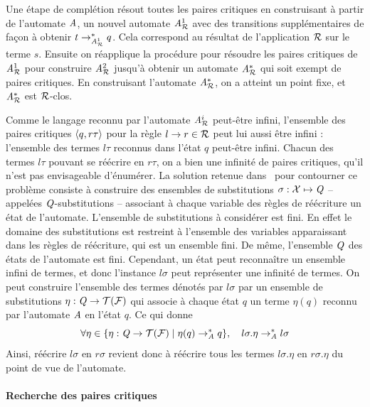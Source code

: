 
Une étape de complétion résout toutes les paires critiques en construisant
à partir de l'automate $\mathit A$, un nouvel automate ${\mathit A}_{\mathcal R}^1$ avec des transitions
supplémentaires de façon à obtenir $t \rightarrow_{{\mathit A}_{\mathcal R}^1}^* q$. Cela correspond
au résultat de l'application $\mathcal R$ sur le terme $s$. Ensuite on réapplique la procédure
pour résoudre les paires critiques de ${\mathit A}_{\mathcal R}^1$ pour construire ${\mathit A}_{\mathcal R}^2$ jusqu'à obtenir
un automate ${\mathit A}_{\mathcal R}^*$ qui soit exempt de paires critiques. En construisant l'automate ${\mathit A}_{\mathcal R}^*$,
on a atteint un point fixe, et ${\mathit A}_{\mathcal R}^*$ est $\mathcal R$-clos.

Comme le langage reconnu par l'automate ${\mathit A}_{\mathcal R}^i$ peut-être infini, l'ensemble
des paires critiques $\langle q, r\tau\rangle$ pour la règle $l\rightarrow r\in \mathcal R$ peut lui aussi être infini : 
l'ensemble des termes $l\tau$ reconnus dans l'état $q$ peut-être infini. Chacun des termes $l\tau$
pouvant se réécrire en $r\tau$, on a bien une infinité de paires critiques, qu'il n'est pas envisageable
d'énumérer.
La solution retenue dans~\cite{Genet-RTA98} pour contourner ce problème consiste à construire des ensembles de
substitutions $\sigma: \mathcal X \mapsto \mathit Q$ -- appelées $\mathit Q$-substitutions -- associant à chaque variable des règles de réécriture 
un état de l'automate. L'ensemble de substitutions à considérer est fini. En effet le domaine des substitutions est restreint à l'ensemble des
variables apparaissant dans les règles de réécriture, qui est un ensemble fini. De même, l'ensemble $\mathit Q$ des états de l'automate est fini.
Cependant, un état peut reconnaître un ensemble infini de termes, et donc l'instance $l\sigma$ peut représenter une infinité de termes.
On peut construire l'ensemble des termes dénotés par $l\sigma$ par un ensemble de substitutions $\eta: \mathit Q \rightarrow \mathcal{T(F)}$ qui associe à chaque état $q$ 
un terme $\eta(q)$ reconnu par l'automate $\mathit A$ en l'état $q$. %
Ce qui donne 
\[\forall \eta \in \{ \eta : \mathit Q \rightarrow \mathcal{T(F)} \; | \; \eta(q) \rightarrow_\mathit A^* q\},\quad l\sigma.\eta \rightarrow^*_\mathit A  l\sigma\]
Ainsi, réécrire $l\sigma$ en $r\sigma$ revient donc à réécrire tous les termes $l\sigma.\eta$ en $r\sigma.\eta$ du point de vue de l'automate.

\paragraph{Recherche des paires critiques}
\label{sec:recherche-des-paires}

